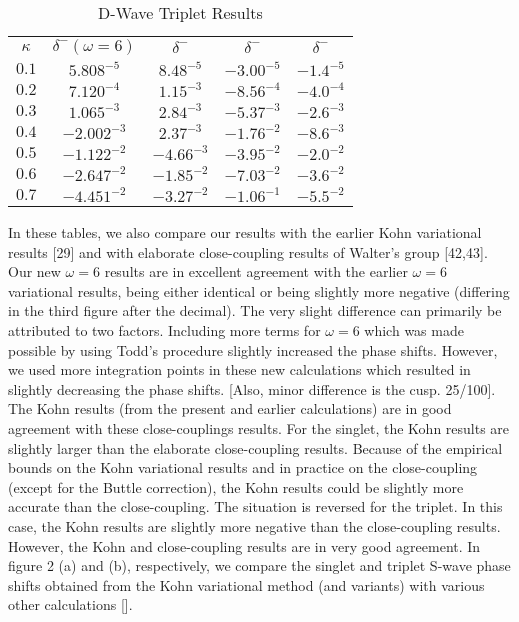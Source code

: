 \documentclass[preprint,showpacs,preprintnumbers,amsmath,amssymb]{revtex4}
\begin{document}
\begin{table}
\begin{center}
\begin{ruledtabular}
\begin{tabular}{c c c c c}
$\kappa$ & $\delta^- (\omega = 6)$ & $\delta^-$ \cite{Blackwood2002} & $\delta^-$ \cite{Ray1997} & $\delta^-$ \cite{Adhikari1999} \\
\colrule
$0.1$ & $5.808^{-5}$ & $8.48^{-5}$ & $-3.00^{-5}$ & $-1.4^{-5}$ \\
$0.2$ & $7.120^{-4}$ & $1.15^{-3}$ & $-8.56^{-4}$ & $-4.0^{-4}$ \\
$0.3$ & $1.065^{-3}$ & $2.84^{-3}$ & $-5.37^{-3}$ & $-2.6^{-3}$ \\
$0.4$ & $-2.002^{-3}$ & $2.37^{-3}$ & $-1.76^{-2}$ & $-8.6^{-3}$ \\
$0.5$ & $-1.122^{-2}$ & $-4.66^{-3}$ & $-3.95^{-2}$ & $-2.0^{-2}$ \\
$0.6$ & $-2.647^{-2}$ & $-1.85^{-2}$ & $-7.03^{-2}$ & $-3.6^{-2}$ \\
$0.7$ & $-4.451^{-2}$ & $-3.27^{-2}$ & $-1.06^{-1}$ & $-5.5^{-2}$ \\
\end{tabular}
\end{ruledtabular}
\caption{D-Wave Triplet Results}
\label{tab:DWaveTriplet}
\end{center}
\end{table}



In these tables, we also compare our results with the earlier Kohn
variational results [29] and with  elaborate
close-coupling results of Walter's group [42,43].
Our new $\omega=6$ results are in excellent agreement with 
the earlier $\omega =6$ variational results, being either identical or 
being  slightly more negative (differing in the third figure after
the decimal). 
The very slight difference can primarily
be attributed to two factors.
Including more terms for $\omega=6$ which was made possible
by using Todd's procedure slightly increased the phase shifts.
However, we used more integration points in these new
calculations which resulted in slightly decreasing
the phase shifts.
[Also, minor difference is the cusp. 25/100].
The Kohn results (from the present and earlier calculations) 
are in good agreement with these close-couplings results.
For the singlet, the Kohn results are slightly
larger than the elaborate close-coupling results.
Because of the empirical bounds on the
Kohn variational results and in practice on
the close-coupling (except for the Buttle
correction), the Kohn results could be
slightly more accurate than the close-coupling.
The situation is reversed for the triplet.
In this case, the Kohn results are slightly
more negative than the close-coupling results.
However, the Kohn and close-coupling results are
in very good agreement.
In figure 2 (a) and (b), respectively,
we compare the singlet and triplet
S-wave phase shifts obtained from the Kohn variational
method (and variants)  with various other calculations [].
\end{document}

